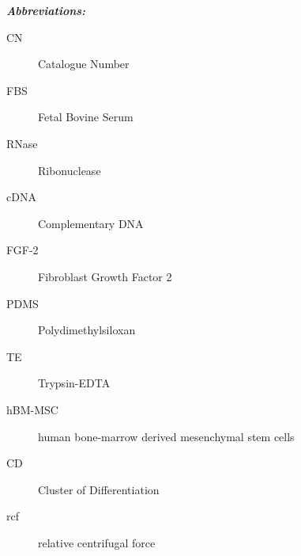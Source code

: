 \textit{\textbf{Abbreviations:}}
\begin{description}
\item[CN] Catalogue Number
\item[FBS] Fetal Bovine Serum
\item[RNase] Ribonuclease
\item[cDNA] Complementary DNA
\item[FGF-2] Fibroblast Growth Factor 2
\item[PDMS] Polydimethylsiloxan
\item[TE] Trypsin-EDTA
\item[hBM-MSC] human bone-marrow derived mesenchymal stem cells 
\item[CD] Cluster of Differentiation
\item[rcf] relative centrifugal force
\end{description}